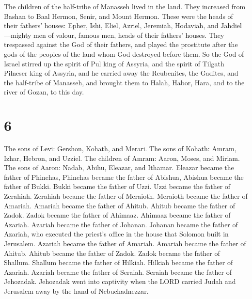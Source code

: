  The children of the half-tribe of Manasseh lived in the
land. They increased from Bashan to Baal Hermon, Senir, and Mount
Hermon.  These were the heads of their fathers' houses:
Epher, Ishi, Eliel, Azriel, Jeremiah, Hodaviah, and Jahdiel---mighty men
of valour, famous men, heads of their fathers' houses. 
They trespassed against the God of their fathers, and played the
prostitute after the gods of the peoples of the land whom God destroyed
before them.  So the God of Israel stirred up the spirit
of Pul king of Assyria, and the spirit of Tilgath Pilneser king of
Assyria, and he carried away the Reubenites, the Gadites, and the
half-tribe of Manasseh, and brought them to Halah, Habor, Hara, and to
the river of Gozan, to this day.

\hypertarget{section-5}{%
\section{6}\label{section-5}}

 The sons of Levi: Gershon, Kohath, and Merari.
 The sons of Kohath: Amram, Izhar, Hebron, and Uzziel.
 The children of Amram: Aaron, Moses, and Miriam. The sons
of Aaron: Nadab, Abihu, Eleazar, and Ithamar.  Eleazar
became the father of Phinehas, Phinehas became the father of Abishua,
 Abishua became the father of Bukki. Bukki became the
father of Uzzi.  Uzzi became the father of Zerahiah.
Zerahiah became the father of Meraioth.  Meraioth became
the father of Amariah. Amariah became the father of Ahitub.
 Ahitub became the father of Zadok. Zadok became the
father of Ahimaaz.  Ahimaaz became the father of Azariah.
Azariah became the father of Johanan.  Johanan became the
father of Azariah, who executed the priest's office in the house that
Solomon built in Jerusalem.  Azariah became the father of
Amariah. Amariah became the father of Ahitub.  Ahitub
became the father of Zadok. Zadok became the father of Shallum.
 Shallum became the father of Hilkiah. Hilkiah became the
father of Azariah.  Azariah became the father of Seraiah.
Seraiah became the father of Jehozadak.  Jehozadak went
into captivity when the LORD carried Judah and Jerusalem away by the
hand of Nebuchadnezzar.

